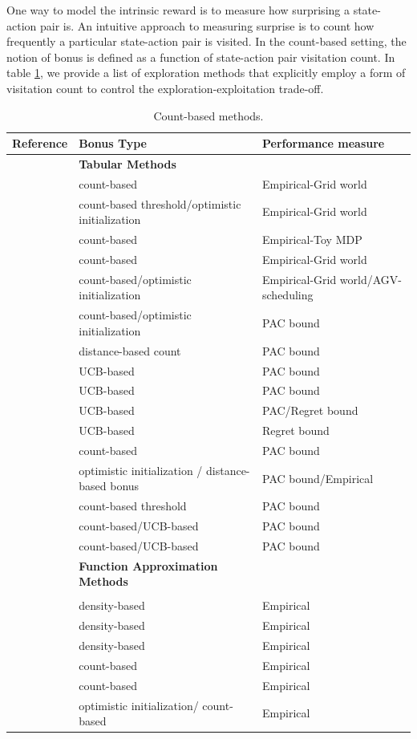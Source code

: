 One way to model the intrinsic reward is to measure how surprising a state-action pair is. An intuitive approach to measuring surprise is to count how frequently a particular state-action pair is visited.  In the count-based setting, the notion of bonus is defined as a function of state-action pair visitation count. In table \ref{tab:visitation-count}, we provide a list of exploration methods that explicitly employ a form of visitation count to control the exploration-exploitation trade-off.  
\begin{table} 
\centering
\begin{tabular}{p{6cm}|p{5cm}|p{5cm}}
    Reference & Bonus Type & Performance measure \\
    \hline
    &\textbf{Tabular Methods}& \\
    \hline
     &  count-based & Empirical-Grid world \\
      &  count-based threshold/optimistic initialization & Empirical-Grid world \\
     &  count-based &  Empirical-Toy MDP\\
     & count-based  & Empirical-Grid world\\
     & count-based/optimistic initialization  &  Empirical-Grid world/AGV-scheduling\\
     &  count-based/optimistic initialization  & PAC bound \\
     & distance-based count & PAC bound\\
     & UCB-based & PAC bound\\
     & UCB-based & PAC bound\\
     & UCB-based & PAC/Regret bound\\
     & UCB-based & Regret bound\\
     & count-based  & PAC bound\\
     & optimistic initialization / distance-based bonus  & PAC bound/Empirical \\
     & count-based threshold &  PAC bound\\
     & count-based/UCB-based  & PAC bound \\
     & count-based/UCB-based  & PAC bound\\
    \hline
    &\textbf{Function Approximation Methods}& \\
    \hline
     & & \\
     & density-based  & Empirical \\
     & density-based  & Empirical\\
     & density-based  & Empirical\\
     & count-based  & Empirical\\
     &count-based  & Empirical\\
     & optimistic initialization/ count-based  &  Empirical
\end{tabular}
\caption{Count-based methods.}
\label{tab:visitation-count}
\end{table}

